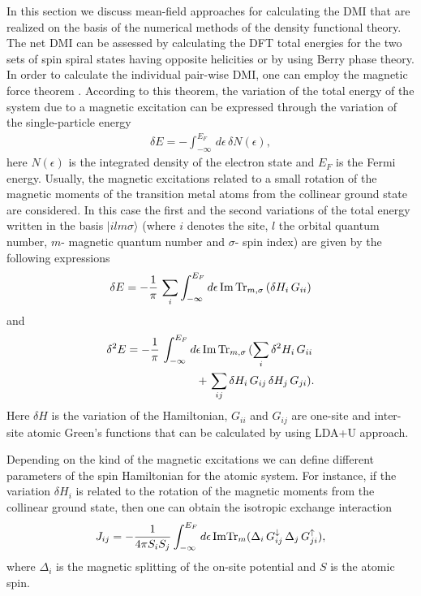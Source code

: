 \documentclass[aps,prl,twocolumn,showpacs,amsmath,amssymb]{revtex4-1}
\begin{document}
In this section we discuss mean-field approaches for calculating the DMI that are realized on the basis of the numerical methods of the density functional theory.
The net DMI can be assessed by calculating the DFT total energies for the two sets of spin spiral states having opposite helicities\cite{chshiev,zimmermann,sandratskii} or by using Berry phase theory\cite{Freimuth}.
In order to calculate the individual pair-wise DMI, one can employ the magnetic force theorem \cite{force}. 
According to this theorem, the variation of the total energy of the system due to a magnetic excitation can be expressed through the variation of the single-particle energy
\begin{eqnarray}
\delta E = - \int_{-\infty}^{E_{F}} \, d \epsilon \, \delta N (\epsilon),
\end{eqnarray}
here $N(\epsilon)$ is the integrated density of the electron state and $E_{F}$ is the Fermi energy.
Usually, the magnetic excitations related to a small rotation of the magnetic moments of the transition metal atoms from the collinear ground state are considered.
In this case the first and the second variations of the total energy written in the basis $|ilm\sigma\rangle$ (where $i$ denotes the site, $l$ the orbital quantum number, $m$- magnetic quantum number and
$\sigma$- spin index) are given by the following expressions
\begin{eqnarray}
\delta E=  - \frac{1}{\pi} \, \sum_{i} \int_{-\infty}^{E_{F}} d \epsilon \, {\rm Im} \, {\rm Tr}_{m,\sigma} \,  (\delta H_{i} \, G_{ii}) \label{firstvarE}
\end{eqnarray}
and
\begin{eqnarray}
\delta^{2} E=  - \frac{1}{\pi} \, \int_{-\infty}^{E_{F}} d \epsilon \, {\rm Im} \, {\rm Tr}_{m, \sigma} \, ( \sum_{i} \delta^{2} H_{i} \, G_{ii} \, \nonumber \\
+ \, \sum_{ij} \delta H_{i} \, G_{ij} \, \delta H_{j} \, G_{ji}).
\end{eqnarray}
Here $\delta H$ is the variation of the Hamiltonian, $G_{ii}$ and $G_{ij}$ are one-site and inter-site atomic Green's functions that can be calculated by using LDA+U approach.

Depending on the kind of the magnetic excitations we can define different parameters of the spin Hamiltonian for the atomic system. For instance, if the variation $\delta H_{i}$ is related to the rotation of the magnetic moments from the collinear ground state, then one can obtain the isotropic exchange interaction \cite{force}
\begin{eqnarray}
\label{J_Gr}
J_{ij} = -\frac{1}{4\pi S_i S_j} \int_{-\infty}^{E_{F}} d\epsilon \, {\rm Im}
{\rm Tr}_{m} (\Delta_{i} \,
G_{ij}^{\downarrow} \, \Delta_{j} \, G_{ji}^{\uparrow}),
\end{eqnarray}
where $\Delta_{i}$ is the magnetic splitting of the on-site potential and $S$ is the atomic spin.
\end{document}
